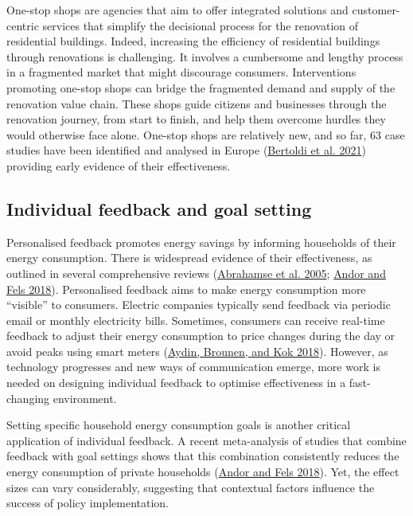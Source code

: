 \documentclass[
  11pt,
]{article}
\begin{document}
One-stop shops are agencies that aim to offer integrated solutions and
customer-centric services that simplify the decisional process for the
renovation of residential buildings. Indeed, increasing the efficiency
of residential buildings through renovations is challenging. It involves
a cumbersome and lengthy process in a fragmented market that might
discourage consumers. Interventions promoting one-stop shops can bridge
the fragmented demand and supply of the renovation value chain. These
shops guide citizens and businesses through the renovation journey, from
start to finish, and help them overcome hurdles they would otherwise
face alone. One-stop shops are relatively new, and so far, 63 case
studies have been identified and analysed in Europe
(\protect\hyperlink{ref-bertoldi2021role}{Bertoldi et al. 2021})
providing early evidence of their effectiveness.

\hypertarget{individual-feedback-and-goal-setting}{%
\subsection{Individual feedback and goal
setting}\label{individual-feedback-and-goal-setting}}

Personalised feedback promotes energy savings by informing households of
their energy consumption. There is widespread evidence of their
effectiveness, as outlined in several comprehensive reviews
(\protect\hyperlink{ref-abrahamse2005review}{Abrahamse et al. 2005};
\protect\hyperlink{ref-andor2018behavioral}{Andor and Fels 2018}).
Personalised feedback aims to make energy consumption more ``visible''
to consumers. Electric companies typically send feedback via periodic
email or monthly electricity bills. Sometimes, consumers can receive
real-time feedback to adjust their energy consumption to price changes
during the day or avoid peaks using smart meters
(\protect\hyperlink{ref-aydin2018information}{Aydin, Brounen, and Kok
2018}). However, as technology progresses and new ways of communication
emerge, more work is needed on designing individual feedback to optimise
effectiveness in a fast-changing environment.

Setting specific household energy consumption goals is another critical
application of individual feedback. A recent meta-analysis of studies
that combine feedback with goal settings shows that this combination
consistently reduces the energy consumption of private households
(\protect\hyperlink{ref-andor2018behavioral}{Andor and Fels 2018}). Yet,
the effect sizes can vary considerably, suggesting that contextual
factors influence the success of policy implementation.
\end{document}

